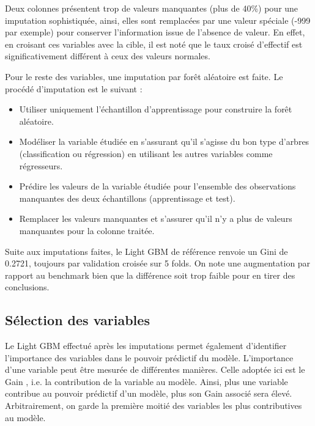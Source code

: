 \documentclass[french]{article}
\begin{document}
\begin{multicols}{2}
Deux colonnes présentent trop de valeurs manquantes (plus de 40\%) pour une imputation sophistiquée, ainsi, elles sont remplacées par une valeur spéciale (-999 par exemple) pour conserver l'information issue de l'absence de valeur. En effet, en croisant ces variables avec la cible, il est noté que le taux croisé d'effectif est significativement différent à ceux des valeurs normales.

Pour le reste des variables, une imputation par forêt aléatoire est faite. Le procédé d'imputation est le suivant :
\begin{itemize}
    \item Utiliser uniquement l'échantillon d'apprentissage pour construire la forêt aléatoire.
    \item Modéliser la variable étudiée en s'assurant qu'il s'agisse du bon type d'arbres (classification ou régression) en utilisant les autres variables comme régresseurs.
    \item Prédire les valeurs de la variable étudiée pour l'ensemble des observations manquantes des deux échantillons (apprentissage et test).
    \item Remplacer les valeurs manquantes et s'assurer qu'il n'y a plus de valeurs manquantes pour la colonne traitée.
\end{itemize}

Suite aux imputations faites, le Light GBM de référence renvoie un Gini de 0.2721, toujours par validation croisée sur 5 folds. On note une augmentation par rapport au benchmark bien que la différence soit trop faible pour en tirer des conclusions.

\subsection{Sélection des variables}

Le Light GBM effectué après les imputations permet également d'identifier l'importance des variables dans le pouvoir prédictif du modèle. L'importance d'une variable peut être mesurée de différentes manières. Celle adoptée ici est le \og Gain \fg{}, i.e. la contribution de la variable au modèle. Ainsi, plus une variable contribue au pouvoir prédictif d'un modèle, plus son \og Gain \fg{} associé sera élevé. Arbitrairement, on garde la première moitié des variables les plus contributives au modèle.


\end{multicols}
\end{document}
